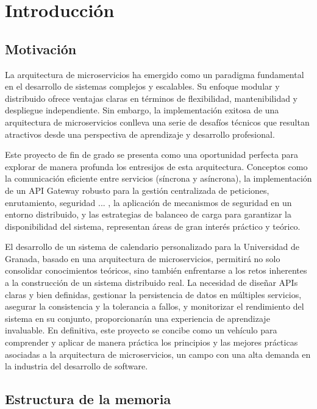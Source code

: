 \chapter{Introducción}\label{cap:introduccion}

\section{Motivación}

La arquitectura de microservicios ha emergido como un paradigma fundamental en el desarrollo de sistemas complejos y escalables. Su enfoque modular y distribuido ofrece ventajas claras en términos de flexibilidad, mantenibilidad y despliegue independiente. Sin embargo, la implementación exitosa de una arquitectura de microservicios conlleva una serie de desafíos técnicos que resultan atractivos desde una perspectiva de aprendizaje y desarrollo profesional.

Este proyecto de fin de grado se presenta como una oportunidad perfecta para explorar de manera profunda los entresijos de esta arquitectura. Conceptos como la comunicación eficiente entre servicios (síncrona y asíncrona), la implementación de un API Gateway robusto para la gestión centralizada de peticiones, enrutamiento, seguridad ... , la aplicación de mecanismos de seguridad en un entorno distribuido, y las estrategias de balanceo de carga para garantizar la disponibilidad del sistema, representan áreas de gran interés práctico y teórico.

El desarrollo de un sistema de calendario personalizado para la Universidad de Granada, basado en una arquitectura de microservicios, permitirá no solo consolidar conocimientos teóricos, sino también enfrentarse a los retos inherentes a la construcción de un sistema distribuido real. La necesidad de diseñar APIs claras y bien definidas, gestionar la persistencia de datos en múltiples servicios, asegurar la consistencia y la tolerancia a fallos, y monitorizar el rendimiento del sistema en su conjunto, proporcionarán una experiencia de aprendizaje invaluable. En definitiva, este proyecto se concibe como un vehículo para comprender y aplicar de manera práctica los principios y las mejores prácticas asociadas a la arquitectura de microservicios, un campo con una alta demanda en la industria del desarrollo de software.

\section{Estructura de la memoria}

